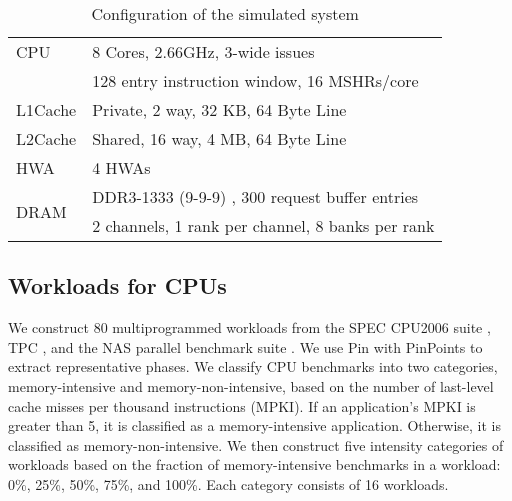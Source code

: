 \documentclass[10pt,letterpaper]{article}
\begin{document}
\begin{table}[h!]
\vspace{-3mm}
\footnotesize
  \centering
  \begin{tabular}{|l|l|}
    \hline
    CPU & 8 Cores, 2.66GHz, 3-wide issues\\
        &  128 entry instruction window, 16 MSHRs/core \\
    \hline
    L1Cache & Private, 2 way, 32 KB, 64 Byte Line \\
    \hline
    L2Cache & Shared, 16 way, 4 MB, 64 Byte Line \\
    \hline
    HWA & 4 HWAs \\
    \hline
    \multirow{2}{*}{\begin{minipage}{0.5in}DRAM\end{minipage}} & DDR3-1333
    (9-9-9) \cite{micron-ddr3}, 300 request buffer entries \\
    & 2 channels, 1 rank per channel, 8 banks per rank \\
    \hline
  \end{tabular}
  \vspace{-2mm}
  \caption{Configuration of the simulated system}
  \label{sim_env}
\end{table}
\vspace{-0.3in}



\subsection{Workloads for CPUs} 
We construct 80 multiprogrammed workloads from
the SPEC CPU2006 suite \cite{spec2006}, TPC \cite{tpc}, and the NAS parallel
benchmark suite \cite{nas}. We use Pin \cite{pin} with PinPoints \cite{pinpoint}
to extract representative phases. We classify CPU benchmarks into two
categories, memory-intensive and memory-non-intensive, based on the number of
last-level cache misses per thousand instructions (MPKI). If an application's
MPKI is greater than 5, it is classified as a memory-intensive application.
Otherwise, it is classified as memory-non-intensive. We then construct five
intensity categories of workloads based on the fraction of memory-intensive
benchmarks in a workload: 0\%, 25\%, 50\%, 75\%, and 100\%. Each category
consists of 16 workloads.
\end{document}
